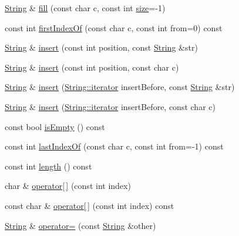 \begin{DoxyCompactItemize}
\item 
\hyperlink{classprism_1_1_string}{String} \& \hyperlink{classprism_1_1_string_ae7d89942e4c7ab431331400eb5489854}{fill} (const char c, const int \hyperlink{classprism_1_1_string_a603b5a90681d43adf7c6c29018e0300c}{size}=-\/1)
\item 
const int \hyperlink{classprism_1_1_string_af3b71f73c184a5f14ef91ad6e56187b7}{first\+Index\+Of} (const char c, const int from=0) const 
\item 
\hyperlink{classprism_1_1_string}{String} \& \hyperlink{classprism_1_1_string_aebf2f6e19cb77967798ba096bb559f81}{insert} (const int position, const \hyperlink{classprism_1_1_string}{String} \&str)
\item 
\hyperlink{classprism_1_1_string}{String} \& \hyperlink{classprism_1_1_string_a370a65ea4c44d5f2e3d85f441f708c3f}{insert} (const int position, const char c)
\item 
\hyperlink{classprism_1_1_string}{String} \& \hyperlink{classprism_1_1_string_ae21a3ae6bcf4bd889a4994fead75188c}{insert} (\hyperlink{classprism_1_1_string_adacc7975837e5fff95d70690777fb330}{String\+::iterator} insert\+Before, const \hyperlink{classprism_1_1_string}{String} \&str)
\item 
\hyperlink{classprism_1_1_string}{String} \& \hyperlink{classprism_1_1_string_ac9d7c3aa36ad7a33ba9f13a00456beec}{insert} (\hyperlink{classprism_1_1_string_adacc7975837e5fff95d70690777fb330}{String\+::iterator} insert\+Before, const char c)
\item 
const bool \hyperlink{classprism_1_1_string_a2f2960f59d644b2d0f390a090fa7a4ef}{is\+Empty} () const 
\item 
const int \hyperlink{classprism_1_1_string_a94a9059dc86dcfcbf409ffc83f3da2a8}{last\+Index\+Of} (const char c, const int from=-\/1) const 
\item 
const int \hyperlink{classprism_1_1_string_a7dfc72427863cefb9fe883599272ca7d}{length} () const 
\item 
char \& \hyperlink{classprism_1_1_string_a2aa545085262fc28c9199a5790bfbd0a}{operator\mbox{[}$\,$\mbox{]}} (const int index)
\item 
const char \& \hyperlink{classprism_1_1_string_ad519fe1a0696fe5c4b77808d605bc68e}{operator\mbox{[}$\,$\mbox{]}} (const int index) const 
\item 
\hyperlink{classprism_1_1_string}{String} \& \hyperlink{classprism_1_1_string_ad2c84ac36bccdb26c446d32a1615f321}{operator=} (const \hyperlink{classprism_1_1_string}{String} \&other)
\item 

\end{DoxyCompactItemize}
